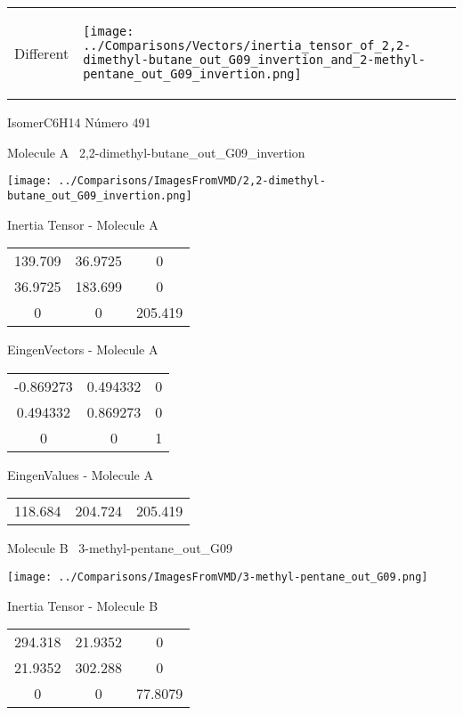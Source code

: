 \vtab[-5mm]
\begin{tabular}{*{2}{m{}}}
\begin{center}
\textcolor{NavyBlue}{\Large Different}
\end{center}
&
\begin{center}
\texttt{[image: ../Comparisons/Vectors/inertia\_tensor\_of\_2,2-dimethyl-butane\_out\_G09\_invertion\_and\_2-methyl-pentane\_out\_G09\_invertion.png]}
\end{center}
\end{tabular}

 \newpage

\vtab[-3cm]
\begin{center}
{\large IsomerC6H14 \tab Número 491}
\end{center}
\begin{multicols}{2}
\begin{center}

Molecule A \
2,2-dimethyl-butane\_out\_G09\_invertion

\texttt{[image: ../Comparisons/ImagesFromVMD/2,2-dimethyl-butane\_out\_G09\_invertion.png]}

Inertia Tensor - Molecule A \\
\begin{tabular}{|c c c|}
139.709	 & 	36.9725	 & 	0	 \\
36.9725	 & 	183.699	 & 	0	 \\
0	 & 	0	 & 	205.419
\end{tabular}

\vtab
 EingenVectors - Molecule A     \\
\begin{tabular}{|c c c|}
-0.869273	 & 	0.494332	 & 	0	 \\
0.494332	 & 	0.869273	 & 	0	 \\
0	 & 	0	 & 	1
\end{tabular}

\vtab
 EingenValues - Molecule A     \\
\begin{tabular}{|c c c|}
118.684	 & 	204.724	 & 	205.419	 \\
\end{tabular}
\columnbreak

Molecule B \
3-methyl-pentane\_out\_G09

\texttt{[image: ../Comparisons/ImagesFromVMD/3-methyl-pentane\_out\_G09.png]}

Inertia Tensor - Molecule B \\
\begin{tabular}{|c c c|}
294.318	 & 	21.9352	 & 	0	 \\
21.9352	 & 	302.288	 & 	0	 \\
0	 & 	0	 & 	77.8079
\end{tabular}


\end{center}
\end{multicols}
